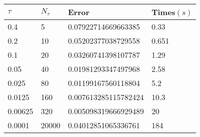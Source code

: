 \begin{tabular}{llll} 
\hline 
$\tau$  & $N_\tau$  &  Error & Times$(s)$  \\ 
\hline \hline 
0.4  & 5 & \num{0.07922714669663385} & 0.33 \\ 
0.2  & 10 & \num{0.05202377038729558} & 0.651 \\ 
0.1  & 20 & \num{0.03260741398107787} & 1.29 \\ 
0.05  & 40 & \num{0.01981293347497968} & 2.58 \\ 
0.025  & 80 & \num{0.01199167560118804} & 5.2 \\ 
0.0125  & 160 & \num{0.007613285115782424} & 10.3 \\ 
0.00625  & 320 & \num{0.005098319666929489} & 20 \\ 
0.0001  & 20000 & \num{0.04012851065336761} & 184 \\ 
\hline 
\end{tabular} 
